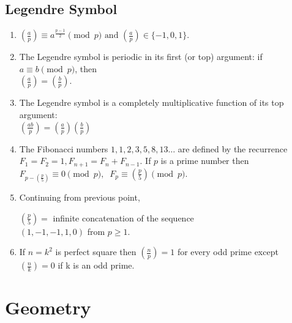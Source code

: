 \subsection{Legendre Symbol}
\begin{enumerate}[resume]
    \item $\displaystyle \left(\frac{a}{p}\right)\equiv a^{\frac{p-1}{2}} \pmod{p} \text{ and } \left(\frac{a}{p}\right)\in\{-1,0,1\}.$
    \item The Legendre symbol is periodic in its first (or top) argument: if $\displaystyle a \equiv b \pmod{p}$, then \\
          $\displaystyle \left(\frac{a}{p}\right)=\left(\frac{b}{p}\right).$
    \item The Legendre symbol is a completely multiplicative function of its top argument: \\
          $\displaystyle \left(\frac{ab}{p} \right) = \left(\frac{a}{p} \right) \left(\frac{b}{p} \right)$
    \item The Fibonacci numbers $\displaystyle 1,1,2,3,5,8,13\dots$ are defined by the recurrence $\displaystyle F_1 = F_2 = 1,F_{n+1} = F_n + F_{n-1}.$ If $\displaystyle p$ is a prime number then \\
          $\displaystyle F_{p-\left(\frac{p}{5}\right)} \equiv 0 {\pmod{p}}, \;\;F_p \equiv \left(\frac{p}{5}\right) {\pmod{p}}.$
    \item Continuing from previous point, \\
          {\raggedright $\displaystyle \left(\frac{p}{5}\right) = $ infinite concatenation of the sequence \\
          $(1,-1,-1,1,0)$ from $p \geq 1$. \par}
    \item If $n = k^2$ is perfect square then $\displaystyle \left(\frac{n}{p}\right)=1$ for every odd prime except $\displaystyle \left(\frac{n}{k}\right)=0$ if k is an odd prime.
\end{enumerate}

\section{Geometry}
